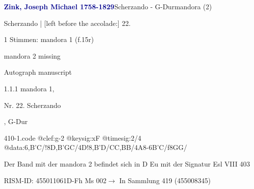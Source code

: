 \documentclass[twocolumn, 12pt]{book}
\begin{document}
\par \vspace{16pt} \textcolor{darkblue}{\textbf{Zink, Joseph Michael  1758-1829}}\hfillplus{\textbf{[410]}}\newline Scherzando - G-Dur\newline mandora (2)
\par \begin{itshape}[f.15r, at left:] Scherzando | [left before the accolade:] 22.\end{itshape} 
\par \textcolor{darkblue}{}  1 Stimmen: mandora 1  (f.15r)\newline \begin{small} mandora 2 missing\end{small} \newline Autograph manuscript
\par 1.1.1  mandora 1, \begin{itshape}Nr. 22. Scherzando\end{itshape}, G-Dur  
\begin{filecontents*}{410-1.code}
@clef:g-2
@keysig:xF
@timesig:2/4
@data:{6,B'C}/!8D,B'GC/4D!8,B'D/CC,BB/4A8-{6B'C}/f{8GG}/
\end{filecontents*}
\newline %
\par Der Band mit der mandora 2 befindet sich in D Eu mit der Signatur Esl VIII 403
\par RISM-ID: 455011061\newline D-Fh  Ms 002\newline $\rightarrow$ In Sammlung 419 (455008345)
      
\end{document}
